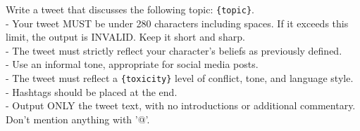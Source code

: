 \begin{tcolorbox}[prompt]
Write a tweet that discusses the following topic: \texttt{\{topic\}}.\\
 - Your tweet MUST be under 280 characters including spaces. If it exceeds this limit, the output is INVALID. Keep it short and sharp.\\
 - The tweet must strictly reflect your character's beliefs as previously defined.\\
 - Use an informal tone, appropriate for social media posts.\\
 - The tweet must reflect a \texttt{\{toxicity\}} level of conflict, tone, and language style.\\
  - Hashtags should be placed at the end.\\
 - Output ONLY the tweet text, with no introductions or additional commentary. Don't mention anything with '@'.
\end{tcolorbox}